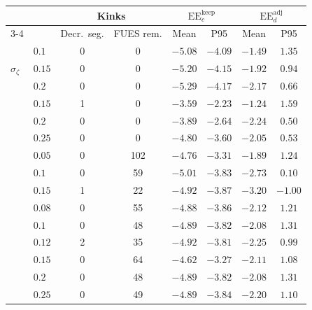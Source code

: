 \begin{tabular}{llcccccc}
\hline
 &  & \multicolumn{2}{c}{Kinks} & \multicolumn{2}{c}{$\mathrm{EE}_c^{\mathrm{keep}}$} & \multicolumn{2}{c}{$\mathrm{EE}_d^{\mathrm{adj}}$} \\
\cline{3-4}\cline{5-6}\cline{7-8}
 &  & Decr.\ seg. & FUES rem. & Mean & P95 & Mean & P95 \\
\hline
\multirow{3}{*}{$\sigma_\zeta$} & $0.1$ & 0 & 0 & $-5.08$ & $-4.09$ & $-1.49$ & $1.35$ \\
 & $0.15$ & 0 & 0 & $-5.20$ & $-4.15$ & $-1.92$ & $0.94$ \\
 & $0.2$ & 0 & 0 & $-5.29$ & $-4.17$ & $-2.17$ & $0.66$ \\
\addlinespace
\multirow{3}{*}{$S$} & $0.15$ & 1 & 0 & $-3.59$ & $-2.23$ & $-1.24$ & $1.59$ \\
 & $0.2$ & 0 & 0 & $-3.89$ & $-2.64$ & $-2.24$ & $0.50$ \\
 & $0.25$ & 0 & 0 & $-4.80$ & $-3.60$ & $-2.05$ & $0.53$ \\
\addlinespace
\multirow{3}{*}{$\sigma_p$} & $0.05$ & 0 & 102 & $-4.76$ & $-3.31$ & $-1.89$ & $1.24$ \\
 & $0.1$ & 0 & 59 & $-5.01$ & $-3.83$ & $-2.73$ & $0.10$ \\
 & $0.15$ & 1 & 22 & $-4.92$ & $-3.87$ & $-3.20$ & $-1.00$ \\
\addlinespace
\multirow{3}{*}{$\sigma_p$ ($S=0.2$)} & $0.08$ & 0 & 55 & $-4.88$ & $-3.86$ & $-2.12$ & $1.21$ \\
 & $0.1$ & 0 & 48 & $-4.89$ & $-3.82$ & $-2.08$ & $1.31$ \\
 & $0.12$ & 2 & 35 & $-4.92$ & $-3.81$ & $-2.25$ & $0.99$ \\
\addlinespace
\multirow{3}{*}{$S$ ($\sigma_p=0.1$)} & $0.15$ & 0 & 64 & $-4.62$ & $-3.27$ & $-2.11$ & $1.08$ \\
 & $0.2$ & 0 & 48 & $-4.89$ & $-3.82$ & $-2.08$ & $1.31$ \\
 & $0.25$ & 0 & 49 & $-4.89$ & $-3.84$ & $-2.20$ & $1.10$ \\
\hline
\end{tabular}
